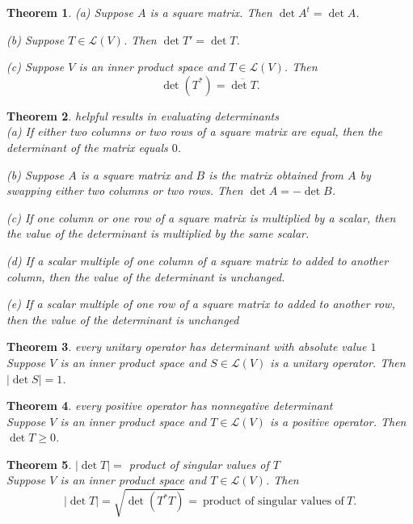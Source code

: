 \documentclass{article}
\newtheorem{theorem}{Theorem}[subsection]
\begin{document}
\begin{CJK}{UTF8}{gkai}
\begin{theorem}
    (a) Suppose $A$ is a square matrix. Then $\det A^t = \det A$.

    (b) Suppose $T \in \mathcal{L}(V)$. Then $\det T' = \det T$.

    (c) Suppose $V$ is an inner product space and $T \in \mathcal{L}(V)$. Then
    \[\det(T^\ast) = \overline{\det T}.\]
\end{theorem}

\begin{theorem}
    helpful results in evaluating determinants\\

    (a) If either two columns or two rows of a square matrix are equal, then the determinant of the matrix equals $0$.

    (b) Suppose $A$ is a square matrix and $B$ is the matrix obtained from $A$ by swapping either two columns or two rows. Then $\det A = - \det B$.

    (c) If one column or one row of a square matrix is multiplied by a scalar, then the value of the determinant is multiplied by the same scalar.

    (d) If a scalar multiple of one column of a square matrix to added to another column, then the value of the determinant is unchanged.

    (e) If a scalar multiple of one row of a square matrix to added to another row, then the value of the determinant is unchanged
\end{theorem}

\begin{theorem}
    every unitary operator has determinant with absolute value $1$\\

    Suppose $V$ is an inner product space and $S \in \mathcal{L}(V)$ is a unitary operator.
    Then $|\det S| = 1$.
\end{theorem}

\begin{theorem}
    every positive operator has nonnegative determinant\\

    Suppose $V$ is an inner product space and $T \in \mathcal{L}(V)$ is a positive operator. Then $\det T \geq 0$.
\end{theorem}

\begin{theorem}
    $|\det T| =$ product of singular values of $T$\\

    Suppose $V$ is an inner product space and $T \in \mathcal{L}(V)$. Then
    \[|\det T| = \sqrt{\det(T^\ast T)} = ~\text{product of singular values of}~ T.\]
\end{theorem}


\end{CJK}
\end{document}
